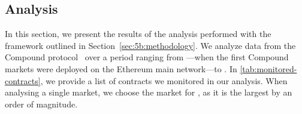


\subsection{Analysis}
\label{sec:5b:analysis}
In this section, we present the results of the analysis performed with the framework outlined in Section~\ref{sec:5b:methodology}.
We analyze data from the Compound protocol~\cite{leshner2018} over a period ranging from \StartDate---when the first Compound markets were deployed on the Ethereum main network---to \EndDate.
In \autoref{tab:monitored-contracts}, we provide a list of contracts we monitored in our analysis.
When analysing a single market, we choose the market for , as it is the largest by an order of magnitude.

